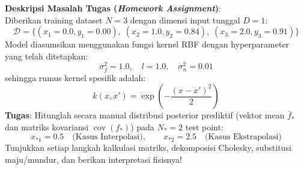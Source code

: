 \documentclass[11pt,a4paper]{article}
\def\mathbf#1{#1}%
\begin{document}
\begin{mdframed}[linewidth=1pt, linecolor=black!60, backgroundcolor=yellow!3]
\textbf{Deskripsi Masalah Tugas (\textit{Homework Assignment})}:\\
Diberikan training dataset $N = 3$ dengan dimensi input tunggal $D = 1$:
\begin{equation*}
\mathcal{D} = \big\{ (x_1 = 0.0, y_1 = 0.00), \; (x_2 = 1.0, y_2 = 0.84), \; (x_3 = 2.0, y_3 = 0.91) \big\}
\end{equation*}
Model diasumsikan menggunakan fungsi kernel RBF dengan hyperparameter yang telah ditetapkan:
\begin{equation*}
\sigma_f^2 = 1.0, \quad l = 1.0, \quad \sigma_n^2 = 0.01
\end{equation*}
sehingga rumus kernel spesifik adalah:
\begin{equation*}
k(x, x') = \exp\left( -\frac{(x - x')^2}{2} \right)
\end{equation*}
\textbf{Tugas}:
Hitunglah secara manual distribusi posterior prediktif (vektor mean $\bar{\mathbf{f}}_*$ dan matriks kovariansi $\operatorname{cov}(\mathbf{f}_*)$) pada $N_* = 2$ test point:
\begin{equation*}
x_{*1} = 0.5 \quad \text{(Kasus Interpolasi)}, \qquad x_{*2} = 2.5 \quad \text{(Kasus Ekstrapolasi)}
\end{equation*}
Tunjukkan setiap langkah kalkulasi matriks, dekomposisi Cholesky, substitusi maju/mundur, dan berikan interpretasi fisisnya!
\end{mdframed}
\end{document}
